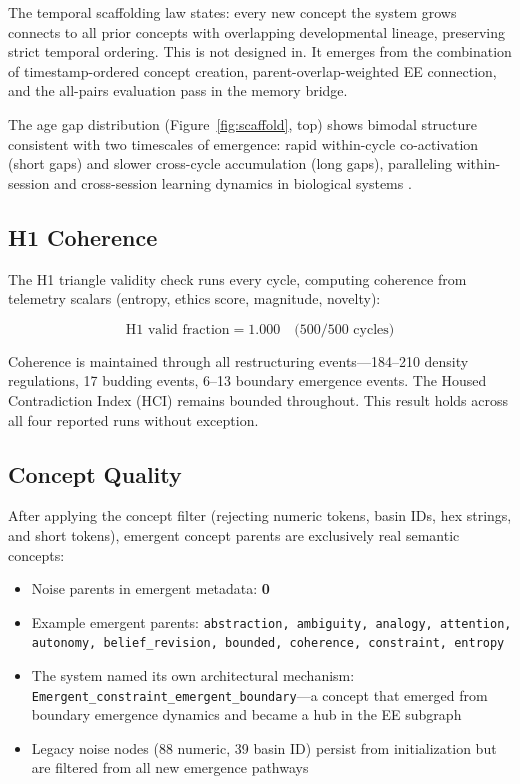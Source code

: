 \documentclass[11pt,a4paper]{article}
\begin{document}
The temporal scaffolding law states: every new concept the system grows connects to all prior concepts with overlapping developmental lineage, preserving strict temporal ordering. This is not designed in. It emerges from the combination of timestamp-ordered concept creation, parent-overlap-weighted EE connection, and the all-pairs evaluation pass in the memory bridge.

The age gap distribution (Figure~\ref{fig:scaffold}, top) shows bimodal structure consistent with two timescales of emergence: rapid within-cycle co-activation (short gaps) and slower cross-cycle accumulation (long gaps), paralleling within-session and cross-session learning dynamics in biological systems \citep{kauffman1993}.

\subsection{H1 Coherence}

The H1 triangle validity check runs every cycle, computing coherence from telemetry scalars (entropy, ethics score, magnitude, novelty):

\begin{equation}
\text{H1 valid fraction} = 1.000 \quad \text{(500/500 cycles)}
\label{eq:h1}
\end{equation}

Coherence is maintained through all restructuring events---184--210 density regulations, 17 budding events, 6--13 boundary emergence events. The Housed Contradiction Index (HCI) remains bounded throughout. This result holds across all four reported runs without exception.

\subsection{Concept Quality}

After applying the concept filter (rejecting numeric tokens, basin IDs, hex strings, and short tokens), emergent concept parents are exclusively real semantic concepts:

\begin{itemize}[nosep]
    \item Noise parents in emergent metadata: \textbf{0}
    \item Example emergent parents: \texttt{abstraction, ambiguity, analogy, attention, autonomy, belief\_revision, bounded, coherence, constraint, entropy}
    \item The system named its own architectural mechanism: \texttt{Emergent\_constraint\_emergent\_boundary}---a concept that emerged from boundary emergence dynamics and became a hub in the EE subgraph
    \item Legacy noise nodes (88 numeric, 39 basin ID) persist from initialization but are filtered from all new emergence pathways
\end{itemize}
\end{document}
